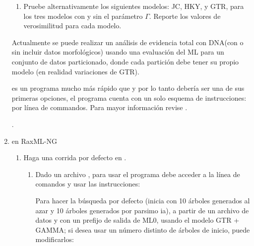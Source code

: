 \begin{enumerate}
\begin{enumerate}
		\item Pruebe alternativamente los siguientes modelos: JC, HKY, y GTR, para los tres modelos con y sin el par\'ametro $\Gamma$. Reporte los valores de verosimilitud para cada modelo.


	\end{enumerate}


  Actualmente se puede realizar un an\'alisis de evidencia total con DNA(con o
  sin incluir datos morfol\'ogicos) usando una evaluaci\'on del ML para un conjunto de datos particionado, donde cada partici\'on debe tener su propio modelo (en realidad variaciones de GTR).

   es un programa mucho m\'as r\'apido que 
   y por lo tanto deber\'ia ser una de sus primeras 
  opciones, el programa cuenta con un solo esquema de instrucciones: 
  por l\'inea de commandos. Para mayor informaci\'on revise 
  .
  
  
  .

  \item{en RaxML-NG}

	\begin{enumerate}
		\item Haga una corrida por defecto en .
		\begin{enumerate}
			\item Dado un archivo , para usar el programa debe acceder a la l\'inea de comandos y usar las instrucciones:

			
			
			
			Para hacer la b\'usqueda por defecto (inicia con 10 
			\'arboles generados al azar y 10 \'arboles generados por 
			parsimo ia), a partir de un archivo de datos  
			 y con un prefijo de salida de ML0, usando 
			el modelo GTR + GAMMA; si desea usar un n\'umero distinto 
			de \'arboles de inicio, puede modificarlos:
			

		\end{enumerate}


\end{enumerate}
\end{enumerate}
